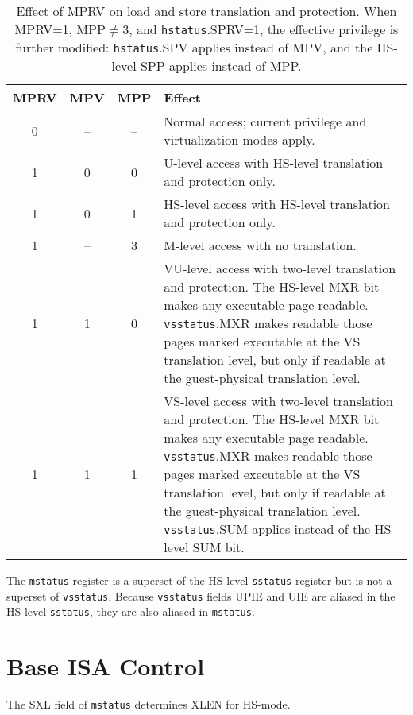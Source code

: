\begin{table*}[h!]
\begin{center}
\begin{tabular}{|c|c|c||p{4.5in}|}
  \hline
   MPRV & MPV & MPP & Effect \\ \hline \hline
   0    & --  & --  & Normal access; current privilege and virtualization modes apply. \\ \hline
   1    & 0   & 0   & U-level access with HS-level translation and protection only. \\ \hline
   1    & 0   & 1   & HS-level access with HS-level translation and protection only.  \\ \hline
   1    & --  & 3   & M-level access with no translation. \\ \hline
   1    & 1   & 0   & VU-level access with two-level translation and protection. The HS-level MXR bit makes any executable page readable.  {\tt vsstatus}.MXR makes readable those pages marked executable at the VS translation level, but only if readable at the guest-physical translation level. \\ \hline
   1    & 1   & 1   & VS-level access with two-level translation and protection. The HS-level MXR bit makes any executable page readable.  {\tt vsstatus}.MXR makes readable those pages marked executable at the VS translation level, but only if readable at the guest-physical translation level.  {\tt vsstatus}.SUM applies instead of the HS-level SUM bit. \\ \hline
 \end{tabular}
\end{center}
\caption{Effect of MPRV on load and store translation and protection.  When MPRV=1, MPP$\neq$3, and {\tt hstatus}.SPRV=1, the effective privilege is further modified: {\tt hstatus}.SPV applies instead of MPV, and the HS-level SPP applies instead of MPP.}
\label{h-mprv}
\end{table*}

The {\tt mstatus} register is a superset of the HS-level {\tt sstatus}
register but is not a superset of {\tt vsstatus}.
Because {\tt vsstatus} fields UPIE and UIE are aliased in the HS-level
{\tt sstatus}, they are also aliased in {\tt mstatus}.

\section{Base ISA Control}

The SXL field of {\tt mstatus} determines XLEN for HS-mode.

